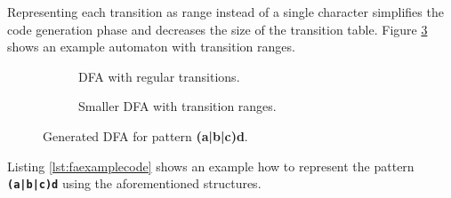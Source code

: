 Representing each transition as range instead of a single character simplifies the code generation phase and decreases the size of the transition table. Figure \ref{fig:automatonrange} shows an example automaton with transition ranges.

\begin{figure}[H]
\begin{subfigure}[b]{\textwidth}
\centering
{}
\caption{DFA with regular transitions.}
\label{fig:automatonrangea}
\end{subfigure}
\par\bigskip
\begin{subfigure}[b]{\textwidth}
\centering
{}
\caption{Smaller DFA with transition ranges.}
\label{fig:automatonrangeb}

\end{subfigure}
\caption{Generated DFA for pattern \textbf{(a|b|c)d}.}\label{fig:automatonrange}
\end{figure}

Listing \ref{lst:faexamplecode} shows an example how to represent the pattern \texttt{\textbf{(a|b|c)d}} using the aforementioned structures.

